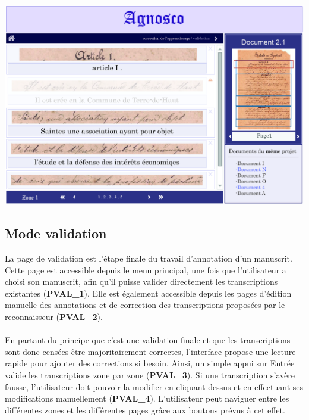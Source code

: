 \begin{mdframed}[frametitle={Figure 9 : Correction de l'IA}, innerbottommargin=10]
\begin{center}
\includegraphics[scale=0.05]{ihm4.jpg}
\end{center}
\end{mdframed}

\subsection{Mode validation}

La page de validation est l’étape finale du travail d’annotation d’un
manuscrit. Cette page est accessible depuis le menu principal, une fois que
l’utilisateur a choisi son manuscrit, afin qu’il puisse valider directement les
transcriptions existantes (\textbf{PVAL\_1}). Elle est également accessible
depuis les pages d’édition manuelle des annotations et de correction des
transcriptions proposées par le reconnaisseur (\textbf{PVAL\_2}).

\paragraph{}
En partant du principe que c’est une validation finale et que les
transcriptions sont donc censées être majoritairement correctes, l’interface
propose une lecture rapide pour ajouter des corrections si besoin. Ainsi, un
simple appui sur Entrée valide les transcriptions zone par zone
(\textbf{PVAL\_3}). Si une transcription s’avère fausse, l’utilisateur doit
pouvoir la modifier en cliquant dessus et en effectuant ses modifications
manuellement (\textbf{PVAL\_4}).  L’utilisateur peut naviguer entre les 
différentes zones et les différentes pages grâce aux boutons prévus à cet effet.

